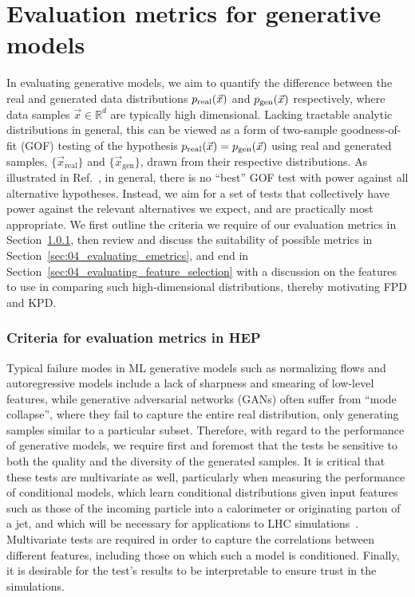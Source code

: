 \section{Evaluation metrics for generative models}
\label{sec:04_evaluating_metrics}

In evaluating generative models, we aim to quantify the difference between the real and generated data distributions $p_\mathrm{real}(\vec{x})$ and $p_\mathrm{gen}(\vec{x})$ respectively, where data samples $\vec{x} \in \mathbb{R}^d$ are typically high dimensional.
Lacking tractable analytic distributions in general, this can be viewed as a form of two-sample goodness-of-fit (GOF) testing of the hypothesis $p_\mathrm{real}(\vec{x}) = p_\mathrm{gen}(\vec{x})$ using real and generated samples, $\{\vec{x}_\mathrm{real}\}$ and $\{\vec{x}_\mathrm{gen}\}$, drawn from their respective distributions.
As illustrated in Ref.~\cite{cousins_gof}, in general, there is no ``best'' GOF test with power against all alternative hypotheses. 
Instead, we aim for a set of tests that collectively have power against the relevant alternatives we expect, and are practically most appropriate.
We first outline the criteria we require of our evaluation metrics in Section~\ref{sec:04_evaluating_criteria}, then review and discuss the suitability of possible metrics in Section~\ref{sec:04_evaluating_emetrics}, and end in Section~\ref{sec:04_evaluating_feature_selection} with a discussion on the features to use in comparing such high-dimensional distributions, thereby motivating FPD and KPD.

\subsubsection{Criteria for evaluation metrics in HEP}
\label{sec:04_evaluating_criteria}

Typical failure modes in ML generative models such as normalizing flows and autoregressive models include a lack of sharpness and smearing of low-level features, while generative adversarial networks (GANs) often suffer from ``mode collapse'', where they fail to capture the entire real distribution, only generating samples similar to a particular subset. 
Therefore, with regard to the performance of generative models, we require first and foremost that the tests be sensitive to both the quality and the diversity of the generated samples.
It is critical that these tests are multivariate as well, particularly when measuring the performance of conditional models, which learn conditional distributions given input features such as those of the incoming particle into a calorimeter or originating parton of a jet, and which will be necessary for applications to LHC simulations~\cite{Butter:2022rso}.
Multivariate tests are required in order to capture the correlations between different features, including those on which such a model is conditioned. 
Finally, it is desirable for the test's results to be interpretable to ensure trust in the simulations. 

